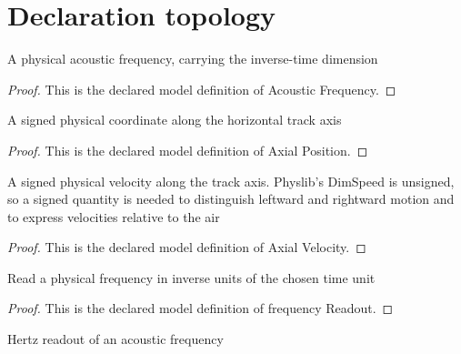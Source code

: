 \section{Declaration topology}
\begin{definition}
  \label{def:physics:phyx-mini-0171:phyxminiproblems-problemphyxmini0171-acousticfrequency}
  A physical acoustic frequency, carrying the inverse-time dimension
\end{definition}
\begin{proof}
  This is the declared model definition of Acoustic Frequency.
\end{proof}
\begin{definition}
  \label{def:physics:phyx-mini-0171:phyxminiproblems-problemphyxmini0171-axialposition}
  A signed physical coordinate along the horizontal track axis
\end{definition}
\begin{proof}
  This is the declared model definition of Axial Position.
\end{proof}
\begin{definition}
  \label{def:physics:phyx-mini-0171:phyxminiproblems-problemphyxmini0171-axialvelocity}
  A signed physical velocity along the track axis. Physlib's DimSpeed is unsigned, so a signed quantity is needed to distinguish leftward and rightward motion and to express velocities relative to the air
\end{definition}
\begin{proof}
  This is the declared model definition of Axial Velocity.
\end{proof}
\begin{definition}
  \label{def:physics:phyx-mini-0171:phyxminiproblems-problemphyxmini0171-frequencyreadout}
  Read a physical frequency in inverse units of the chosen time unit
\end{definition}
\begin{proof}
  This is the declared model definition of frequency Readout.
\end{proof}
\begin{definition}
  \label{def:physics:phyx-mini-0171:phyxminiproblems-problemphyxmini0171-frequencyinhertz}
  Hertz readout of an acoustic frequency
\end{definition}
